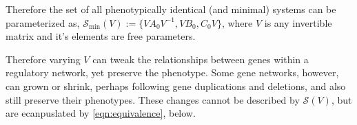 \documentclass{article}
\newcommand{\plr}[1]{\todo[color=blue!25]{#1}}
\newcommand{\plr}[1]{{\color{blue}\it #1}}
\newcommand{\1}{\mathbbm{1}}
\begin{document}

Therefore the set of all phenotypically identical (and minimal) systems can be parameterized as, $\mathcal{S}_{\min}(V) := \{VA_0V^{-1}, VB_0, C_0V \}$,
  where $V$ is any invertible matrix and it's elements are free parameters. 

Therefore varying $V$ can tweak the relationships between genes within a regulatory network, yet preserve the phenotype. Some gene networks, however, can grown or shrink, perhaps following gene duplications and deletions, and also still preserve their phenotypes. These changes cannot be described by $\mathcal{S}(V)$, but are ecanpuslated by \ref{eqn:equivalence}, below.
\end{document}
